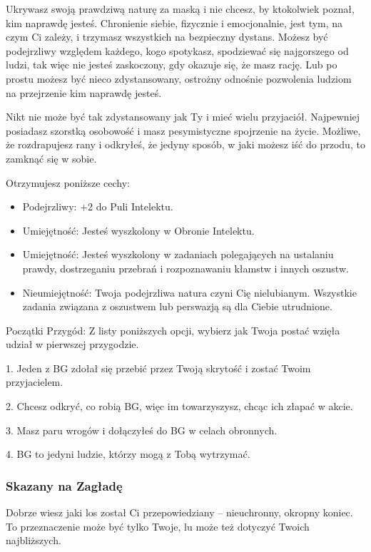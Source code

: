 Ukrywasz swoją prawdziwą naturę za maską i nie chcesz, by ktokolwiek poznał, kim naprawdę jesteś. Chronienie siebie, fizycznie i emocjonalnie, jest tym, na czym Ci zależy, i trzymasz wszystkich na bezpieczny dystans. Możesz być podejrzliwy względem każdego, kogo spotykasz, spodziewać się najgorszego od ludzi, tak więc nie jesteś zaskoczony, gdy okazuje się, że masz rację. Lub po prostu możesz być nieco zdystansowany, ostrożny odnośnie pozwolenia ludziom na przejrzenie kim naprawdę jesteś.

Nikt nie może być tak zdystansowany jak Ty i mieć wielu przyjaciół. Najpewniej posiadasz szorstką osobowość i masz pesymistyczne spojrzenie na życie. Możliwe, że rozdrapujesz rany i odkryłeś, że jedyny sposób, w jaki możesz iść do przodu, to zamknąć się w sobie.

Otrzymujesz poniższe cechy:
\begin{itemize}
    \item  Podejrzliwy: +2 do Puli Intelektu.
    \item  Umiejętność: Jesteś wyszkolony w Obronie Intelektu.
    \item  Umiejętność: Jesteś wyszkolony w zadaniach polegających na ustalaniu prawdy, dostrzeganiu przebrań i rozpoznawaniu kłamstw i innych oszustw.
    \item  Nieumiejętność: Twoja podejrzliwa natura czyni Cię nielubianym. Wszystkie zadania związana z oszustwem lub perswazją są dla Ciebie utrudnione.
\end{itemize}

Początki Przygód: Z listy poniższych opcji, wybierz jak Twoja postać wzięła udział w pierwszej przygodzie.

1. Jeden z BG zdołał się przebić przez Twoją skrytość i zostać Twoim przyjacielem.

2. Chcesz odkryć, co robią BG, więc im towarzyszysz, chcąc ich złapać w akcie.

3. Masz paru wrogów i dołączyłeś do BG w celach obronnych.

4. BG to jedyni ludzie, którzy mogą z Tobą wytrzymać.

\subsubsection{Skazany na Zagładę}

Dobrze wiesz jaki los został Ci przepowiedziany – nieuchronny, okropny koniec. To przeznaczenie może być tylko Twoje, lu może też dotyczyć Twoich najbliższych.

